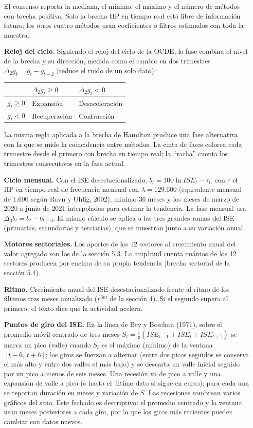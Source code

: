 El consenso reporta la mediana, el mínimo, el máximo y el número de
métodos con brecha positiva. Solo la brecha HP en tiempo real está libre
de información futura; los otros cuatro métodos usan coeficientes o
filtros estimados con toda la muestra.

\textbf{Reloj del ciclo.} Siguiendo el reloj del ciclo de la OCDE, la
fase combina el nivel de la brecha y su dirección, medida como el cambio
en dos trimestres \(\Delta_2 g_t=g_t-g_{t-2}\) (reduce el ruido de un
solo dato):

\small\begin{longtable}[]{@{}lll@{}}
\toprule\noalign{}
& \(\Delta_2 g_t \ge 0\) & \(\Delta_2 g_t < 0\) \\
\midrule\noalign{}
\endhead
\bottomrule\noalign{}
\endlastfoot
\(g_t \ge 0\) & Expansión & Desaceleración \\
\(g_t < 0\) & Recuperación & Contracción \\
\end{longtable}\normalsize

La misma regla aplicada a la brecha de Hamilton produce una fase
alternativa con la que se mide la coincidencia entre métodos. La cinta
de fases colorea cada trimestre desde el primero con brecha en tiempo
real; la ``racha'' cuenta los trimestres consecutivos en la fase actual.

\textbf{Ciclo mensual.} Con el ISE desestacionalizado,
\(b_t = 100\ln ISE_t-\tau_t\), con \(\tau\) el HP en tiempo real de
frecuencia mensual con \(\lambda=129.600\) (equivalente mensual de 1.600
según Ravn y Uhlig, 2002), mínimo 36 meses y los meses de marzo de 2020
a junio de 2021 interpolados para estimar la tendencia. La fase mensual
usa \(\Delta_3 b_t=b_t-b_{t-3}\). El mismo cálculo se aplica a las tres
grandes ramas del ISE (primarias, secundarias y terciarias), que se
muestran junto a su variación anual.

\textbf{Motores sectoriales.} Los aportes de los 12 sectores al
crecimiento anual del valor agregado son los de la sección 5.3. La
amplitud cuenta cuántos de los 12 sectores producen por encima de su
propia tendencia (brecha sectorial de la sección 5.4).

\textbf{Ritmo.} Crecimiento anual del ISE desestacionalizado frente al
ritmo de los últimos tres meses anualizado (\(r^{3m}\) de la sección 4).
Si el segundo supera al primero, el texto dice que la actividad acelera.

\textbf{Puntos de giro del ISE.} En la línea de Bry y Boschan (1971),
sobre el promedio móvil centrado de tres meses
\(S_t=\tfrac13(ISE_{t-1}+ISE_t+ISE_{t+1})\) se marca un pico (valle)
cuando \(S_t\) es el máximo (mínimo) de la ventana \([t-6,\,t+6]\); los
giros se fuerzan a alternar (entre dos picos seguidos se conserva el más
alto y entre dos valles el más bajo) y se descarta un valle inicial
seguido por un pico a menos de seis meses. Una recesión va de pico a
valle y una expansión de valle a pico (o hasta el último dato si sigue
en curso); para cada una se reportan duración en meses y variación de
\(S\). Las recesiones sombrean varios gráficos del sitio. Este fechado
es descriptivo: el promedio centrado y la ventana usan meses posteriores
a cada giro, por lo que los giros más recientes pueden cambiar con datos
nuevos.

